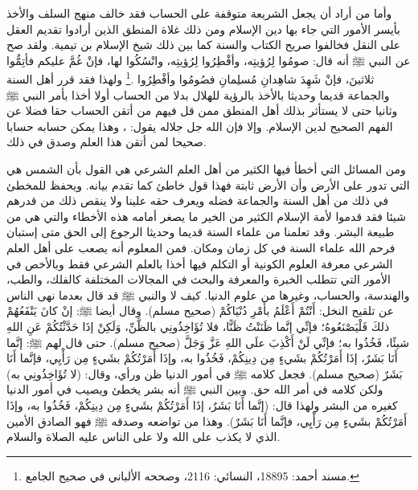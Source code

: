 وأما من أراد أن يجعل الشريعة متوقفة على الحساب فقد خالف منهج السلف والأخذ بأيسر الأمور التي جاء بها دين الإسلام ومن ذلك غلاة المنطق الذين أرادوا تقديم العقل على النقل فخالفوا صريح الكتاب والسنة كما بين ذلك شيخ الإسلام بن تيمية. ولقد صح عن النبي ﷺ أنه قال: صومُوا لِرُؤيتِه، وأفْطِرُوا لِرُؤيتِه، وانْسُكُوا لها، فإنْ غُمَّ عليكم فأتِمُّوا ثلاثينَ، فإنْ شَهِدَ شاهِدانِ مُسلِمانِ فصُومُوا وأفْطِرُوا \href{https://shamela.ws/book/25794/15398#p2}{\faExternalLink} \href{https://shamela.ws/book/21659/7259#p1}{\faExternalLink} \cite{ahmid}.\footnote{مسند أحمد: 18895، النسائي: 2116، وصححه الألباني في صحيح الجامع.} ولهذا فقد قرر أهل السنة والجماعة قديما وحديثا بالأخذ بالرؤية للهلال بدلا من الحساب أولا أخذا بأمر النبي ﷺ وثانيا حتى لا يستأثر بذلك أهل المنطق ممن قل فيهم من أتقن الحساب حقا فضلا عن الفهم الصحيح لدين الإسلام. وإلا فإن الله جل جلاله يقول: \quranayah*[55][5]{\footnotesize \surahname*[55]}، وهذا يمكن حسابه حسابا صحيحا لمن أتقن هذا العلم وصدق في ذلك.

ومن المسائل التي أخطأ فيها الكثير من أهل العلم الشرعي هي القول بأن الشمس هي التي تدور على الأرض وأن الأرض ثابتة فهذا قول خاطئ كما تقدم بيانه. ويحفظ للمخطئ في ذلك من أهل السنة والجماعة فضله ويعرف حقه علينا ولا ينقص ذلك من قدرهم شيئا فقد قدموا لأمة الإسلام الكثير من الخير ما يصغر أمامه هذه الأخطاء والتي هي من طبيعة البشر. وقد تعلمنا من علماء السنة قديما وحديثا الرجوع إلى الحق متى إستبان فرحم الله علماء السنة في كل زمان ومكان. فمن المعلوم أنه يصعب على أهل العلم الشرعي معرفة العلوم الكونية أو التكلم فيها أخذا بالعلم الشرعي فقط وبالأخص في الأمور التي تتطلب الخبرة والمعرفة والبحث في المجالات المختلفة كالفلك، والطب، والهندسة، والحساب، وغيرها من علوم الدنيا. كيف لا والنبي ﷺ قد قال بعدما نهى الناس عن تلقيح النخل: أَنْتُمْ أَعْلَمُ بأَمْرِ دُنْيَاكُمْ {\footnotesize (صحيح مسلم)}. وقال أيضا ﷺ: إنْ كانَ يَنْفَعُهُمْ ذلكَ فَلْيَصْنَعُوهُ؛ فإنِّي إنَّما ظَنَنْتُ ظَنًّا، فلا تُؤَاخِذُونِي بالظَّنِّ، وَلَكِنْ إذَا حَدَّثْتُكُمْ عَنِ اللهِ شيئًا، فَخُذُوا به؛ فإنِّي لَنْ أَكْذِبَ علَى اللهِ عَزَّ وَجَلَّ {\footnotesize (صحيح مسلم)}. حتى قال لهم ﷺ: إنَّما أَنَا بَشَرٌ، إذَا أَمَرْتُكُمْ بشَيءٍ مِن دِينِكُمْ، فَخُذُوا به، وإذَا أَمَرْتُكُمْ بشَيءٍ مِن رَأْيِي، فإنَّما أَنَا بَشَرٌ {\footnotesize (صحيح مسلم)}. فجعل كلامه ﷺ في أمور الدنيا ظن ورأي، وقال: (لا تُؤَاخِذُونِي به) ولكن كلامه في أمر الله حق. وبين النبي ﷺ أنه بشر يخطئ ويصيب في أمور الدنيا كغيره من البشر ولهذا قال:  (إنَّما أَنَا بَشَرٌ، إذَا أَمَرْتُكُمْ بشَيءٍ مِن دِينِكُمْ، فَخُذُوا به، وإذَا أَمَرْتُكُمْ بشَيءٍ مِن رَأْيِي، فإنَّما أَنَا بَشَرٌ). وهذا من تواضعه وصدقه ﷺ فهو الصادق الأمين الذي لا يكذب على الله ولا على الناس عليه الصلاة والسلام.

